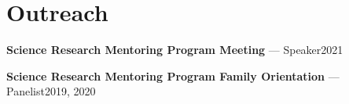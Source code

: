 \section{Outreach}
\vspace*{6pt}

{\setlength{\parskip}{0pt}
\noindent\textbf{Science Research Mentoring Program Meeting} --- Speaker\hfill 2021\par
\noindent\textbf{Science Research Mentoring Program Family Orientation} --- Panelist\hfill 2019, 2020\par
}
